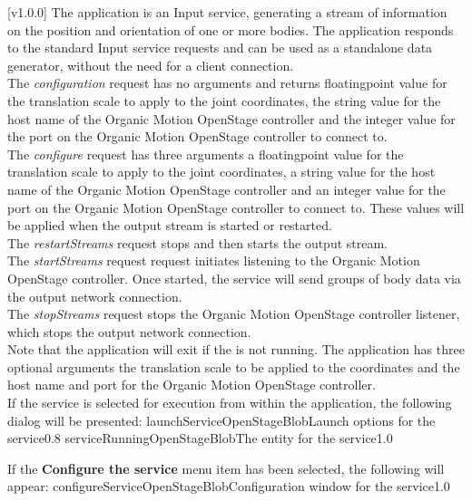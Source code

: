 [v1.0.0]
The  application is an Input service,
generating a stream of information on the position and orientation of one or more bodies.
The application responds to the standard Input service requests and can be used as a
standalone data generator, without the need for a client connection.\\

The \emph{configuration} request has no arguments and returns floating\longDash{}point
value for the translation scale to apply to the joint coordinates, the string value for
the host name of the Organic Motion OpenStage controller and the integer value for the
port on the Organic Motion OpenStage controller to connect to.\\

The \emph{configure} request has three arguments \longDash{} a floating\longDash{}point
value for the translation scale to apply to the joint coordinates, a string value for
the host name of the Organic Motion OpenStage controller and an integer value for the port
on the Organic Motion OpenStage controller to connect to.
These values will be applied when the output stream is started or restarted.\\ 

The \emph{restartStreams} request stops and then starts the output stream.\\

The \emph{startStreams} request request initiates listening to the Organic Motion
OpenStage controller.
Once started, the service will send groups of body data via the output \yarp{} network
connection.\\

The \emph{stopStreams} request stops the Organic Motion OpenStage controller listener,
which stops the output \yarp{} network connection.\\ 

Note that the application will exit if the \emph{\RS} is not running.
The application has three optional arguments \longDash{} the translation scale to be
applied to the coordinates and the host name and port for the Organic Motion OpenStage
controller.
\insertAppParameters
\insertTagDescription{\OSBI}
\insertInputServiceComment\\

\insertStandardServiceCommands
\secondaryEnd
{}
If the service is selected for execution from within the \emph{\MMMU} application, the
following dialog will be presented:
%
{launchServiceOpenStageBlob}{Launch options for the \emph{\OSBI} service}{0.8}
\condPage
{}%
{serviceRunningOpenStageBlob}{The \emph{\MMMU} entity for the \emph{\OSBI} service}{1.0}

If the \textbf{Configure the service} menu item has been selected, the following will
appear:
%
{configureServiceOpenStageBlob}{Configuration window for the \emph{\OSBI} service}{1.0}
\secondaryEnd
\primaryEnd{}

